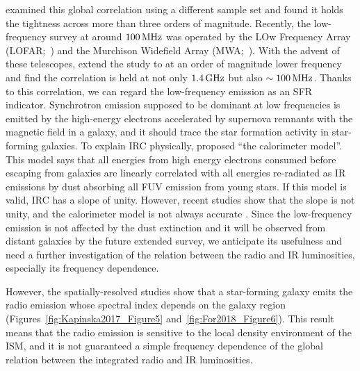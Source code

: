 \citet{Condon1991a,Yun2001a, Bell2003} examined this global correlation using a different sample set and found it holds the tightness across more than three orders of magnitude.
Recently, the low-frequency survey at around $100\,\mathrm{MHz}$ was operated by the LOw Frequency Array (LOFAR;~\citealt{VanHaarlem2013}) and the Murchison Widefield Array (MWA;~\citealt{Tingay2013a}).
With the advent of these telescopes, \citet{CalistroRivera2017a, Read2018, Wang2019} extend the study to at an order of magnitude lower frequency and find the correlation is held at not only $1.4\,\mathrm{GHz}$ but also $\sim 100\,\mathrm{MHz}$.
Thanks to this correlation, we can regard the low-frequency emission as an SFR indicator.
Synchrotron emission supposed to be dominant at low frequencies is emitted by the high-energy electrons accelerated by supernova remnants with the magnetic field in a galaxy, and it should trace the star formation activity in star-forming galaxies.
To explain IRC physically, \citet{Volk1989} proposed ``the calorimeter model''.
This model says that all energies from high energy electrons consumed before escaping from galaxies are linearly correlated with all energies re-radiated as IR emissions by dust absorbing all FUV emission from young stars.
If this model is valid, IRC has a slope of unity.
However, recent studies show that the slope is not unity, and the calorimeter model is not always accurate \citep{CalistroRivera2017a, Read2018}.
Since the low-frequency emission is not affected by the dust extinction \citep{Yun2001a, Murphy2011} and it will be observed from distant galaxies by the future extended survey, we anticipate its usefulness and need a further investigation of the relation between the radio and IR luminosities, especially its frequency dependence.

However, the spatially-resolved studies show that a star-forming galaxy emits the radio emission whose spectral index depends on the galaxy region \citep{Kapinska2017a, For2018a, Heesen2019} (Figures~\ref{fig:Kapinska2017_Figure5} and~\ref{fig:For2018_Figure6}).
This result means that the radio emission is sensitive to the local density environment of the ISM, and it is not guaranteed a simple frequency dependence of the global relation between the integrated radio and IR luminosities.

